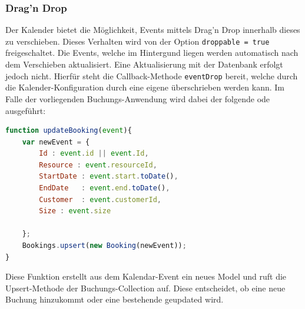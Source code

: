 \subsubsection{Drag'n Drop}
Der Kalender bietet die Möglichkeit, Events mittels Drag'n Drop innerhalb dieses zu verschieben. Dieses Verhalten wird von der Option \texttt{droppable = true} freigeschaltet.
Die Events, welche im Hintergund liegen werden automatisch nach dem Verschieben aktualisiert.
Eine Aktualisierung mit der Datenbank erfolgt jedoch nicht. Hierfür steht die Callback-Methode \texttt{eventDrop} bereit, welche durch die Kalender-Konfiguration durch eine eigene überschrieben
werden kann. Im Falle der vorliegenden Buchungs-Anwendung wird dabei der folgende ode ausgeführt:

 \begin{lstlisting}[language=Javascript, label=code_exampleUpdateBooking, caption=Aktualisierungscode nach einem Drag\'nDrop-Event]
function updateBooking(event){
    var newEvent = {
        Id : event.id || event.Id,
        Resource : event.resourceId,
        StartDate : event.start.toDate(),
        EndDate   : event.end.toDate(),
        Customer  : event.customerId,
        Size : event.size

    };
    Bookings.upsert(new Booking(newEvent));
}
 \end{lstlisting}

 Diese Funktion erstellt aus dem Kalendar-Event ein neues Model und ruft die Upsert-Methode der Buchungs-Collection auf.
 Diese entscheidet, ob eine neue Buchung hinzukommt oder eine bestehende geupdated wird.
